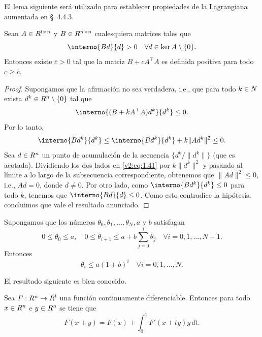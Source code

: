 El lema siguiente será utilizado para establecer propiedades de la Lagrangiana aumentada en \S~4.4.3.

\begin{lemma}\label{v2:lem:1.5.2}
    Sean $A \in R^{l \times n}$ y $B \in R^{n \times n}$ cualesquiera matrices tales que
    \[
        \interno{Bd}{d} > 0 \quad \forall d \in \ker A \setminus \{0\}.
    \]
    Entonces existe $\bar{c} > 0$ tal que la matriz $B + cA^\top A$ es definida positiva para todo $c \ge \bar{c}$.
\end{lemma}

\begin{proof}
    Supongamos que la afirmación no sea verdadera, i.e., que para todo $k \in N$ exista $d^k \in R^n \setminus \{0\}$ tal que
    \[
        \interno{(B + kA^\top A)d^k}{d^k} \le 0.
    \]
    Por lo tanto,
    \begin{equation}
        \interno{Bd^k}{d^k} \le \interno{Bd^k}{d^k} + k\|Ad^k\|^2 \le 0.
        \label{v2:eq:1.41}
    \end{equation}
    Sea $d \in R^n$ un punto de acumulación de la secuencia $\{d^k / \|d^k\|\}$ (que es acotada). Dividiendo los dos lados en \eqref{v2:eq:1.41} por $k\|d^k\|^2$ y pasando al límite a lo largo de la subsecuencia correspondiente, obtenemos que $\|Ad\|^2 \le 0$, i.e., $Ad = 0$, donde $d \neq 0$. Por otro lado, como $\interno{Bd^k}{d^k} \le 0$ para todo $k$, tenemos que $\interno{Bd}{d} \le 0$. Como esto contradice la hipótesis, concluimos que vale el resultado anunciado.
\end{proof}

\begin{lemma}\label{v2:lem:1.5.3}
    Supongamos que los números $\theta_0, \theta_1, \dots, \theta_N, a$ y $b$ satisfagan
    \[
        0 \le \theta_0 \le a, \quad 0 \le \theta_{i+1} \le a + b \sum_{j=0}^i \theta_j \quad \forall i = 0, 1, \dots, N-1.
    \]
    Entonces
    \[
        \theta_i \le a(1+b)^i \quad \forall i = 0, 1, \dots, N.
    \]
\end{lemma}

El resultado siguiente es bien conocido.

\begin{theorem}\label{v2:thm:1.5.2}
    Sea $F : R^n \to R^l$ una función continuamente diferenciable. Entonces para todo $x \in R^n$ e $y \in R^n$ se tiene que
    \[
        F(x+y) = F(x) + \int_0^1 F'(x+ty)y \, dt.
    \]
\end{theorem}

